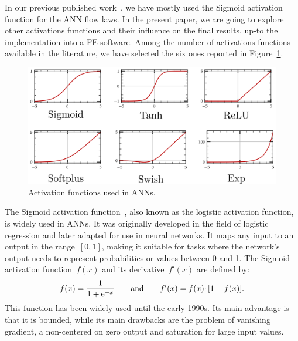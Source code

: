 \documentclass[algorithms,article,submit,pdftex,oneauthors]{Definitions/mdpi}
\DeclareRobustCommand{\e}[1]{{\rm e}^{#1}}
\begin{document}
In our previous published work~\cite{Pantale-2021-EIN, Pantale-2023-DIA}, we have mostly used the Sigmoid activation function for the ANN flow laws.
\textcolor{greencolor}{In the present paper, we are going to explore other activations functions and their influence on the final results, up-to the implementation into a FE software.}
Among the number of activations functions available in the literature, we have selected the six ones reported in Figure~\ref{fig:ActFunctions}.
\begin{figure}[h!]
\centering
\includegraphics[width=0.8\columnwidth]{Figures/ActFunctions}
\caption{Activation functions used in ANNs.}
\label{fig:ActFunctions}
\end{figure}

\textcolor{greencolor}{The Sigmoid activation function~\cite{Han-1995-ISF}, also known as the logistic activation function, is widely used in ANNs.}
It was originally developed in the field of logistic regression and later adapted for use in neural networks.
It maps any input to an output in the range~$[0,1]$, making it suitable for tasks where the network's output needs to represent probabilities or values between 0 and 1.
\textcolor{greencolor}{The Sigmoid activation function~$f(x)$ and its derivative~$f'(x)$ are defined by:}
\begin{equation}
f(x) = \frac{1}{1+\e{-x}}\qquad \text{and}\qquad f'(x) = f(x)\cdotp\left[1-f(x)\right].\label{eq:act-sig}
\end{equation}
\textcolor{greencolor}{This function has been widely used until the early 1990s.
Its main advantage is that it is bounded, while its main drawbacks are the problem of vanishing gradient, a non-centered on zero output and saturation for large input values.}
\end{document}
